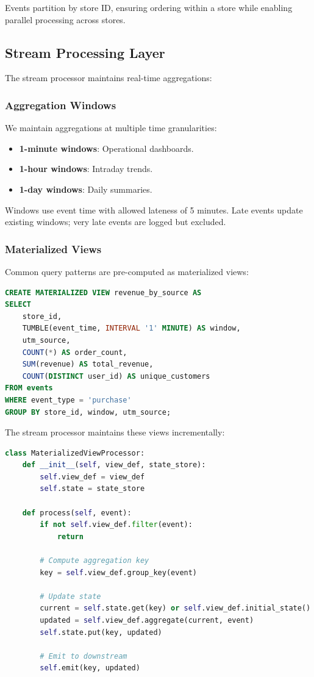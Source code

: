 Events partition by store ID, ensuring ordering within a store while enabling parallel processing across stores.

\subsection{Stream Processing Layer}

The stream processor maintains real-time aggregations:

\subsubsection{Aggregation Windows}

We maintain aggregations at multiple time granularities:

\begin{itemize}
\item \textbf{1-minute windows}: Operational dashboards.
\item \textbf{1-hour windows}: Intraday trends.
\item \textbf{1-day windows}: Daily summaries.
\end{itemize}

Windows use event time with allowed lateness of 5 minutes. Late events update existing windows; very late events are logged but excluded.

\subsubsection{Materialized Views}

Common query patterns are pre-computed as materialized views:

\begin{lstlisting}[language=SQL,caption=Materialized view definition]
CREATE MATERIALIZED VIEW revenue_by_source AS
SELECT
    store_id,
    TUMBLE(event_time, INTERVAL '1' MINUTE) AS window,
    utm_source,
    COUNT(*) AS order_count,
    SUM(revenue) AS total_revenue,
    COUNT(DISTINCT user_id) AS unique_customers
FROM events
WHERE event_type = 'purchase'
GROUP BY store_id, window, utm_source;
\end{lstlisting}

The stream processor maintains these views incrementally:

\begin{lstlisting}[language=Python,caption=Incremental aggregation]
class MaterializedViewProcessor:
    def __init__(self, view_def, state_store):
        self.view_def = view_def
        self.state = state_store

    def process(self, event):
        if not self.view_def.filter(event):
            return

        # Compute aggregation key
        key = self.view_def.group_key(event)

        # Update state
        current = self.state.get(key) or self.view_def.initial_state()
        updated = self.view_def.aggregate(current, event)
        self.state.put(key, updated)

        # Emit to downstream
        self.emit(key, updated)
\end{lstlisting}

